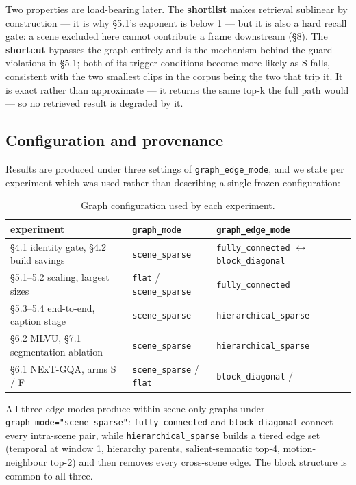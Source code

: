 \documentclass[sigconf,review,anonymous]{acmart}
\begin{document}
Two properties are load-bearing later. The \textbf{shortlist} makes retrieval sublinear by
construction --- it is why §5.1's exponent is below 1 --- but it is also a hard recall gate: a
scene excluded here cannot contribute a frame downstream (§8). The \textbf{shortcut} bypasses the
graph entirely and is the mechanism behind the guard violations in §5.1; both of its trigger
conditions become more likely as S falls, consistent with the two smallest clips in the
corpus being the two that trip it. It is exact rather than approximate --- it returns the same top-k the
full path would --- so no retrieved result is degraded by it.

\subsection{Configuration and provenance}

Results are produced under three settings of \texttt{graph\_edge\_mode}, and we state per experiment
which was used rather than describing a single frozen configuration:

\begin{table}[t]
\small
\setlength{\tabcolsep}{4pt}
\caption{Graph configuration used by each experiment.}
\begin{tabular}{lll}
\toprule
experiment & \texttt{graph\_mode} & \texttt{graph\_edge\_mode} \\
\midrule
§4.1 identity gate, §4.2 build savings & \texttt{scene\_sparse} & \texttt{fully\_connected} \ensuremath{\leftrightarrow} \texttt{block\_diagonal} \\
§5.1--5.2 scaling, largest sizes & \texttt{flat} / \texttt{scene\_sparse} & \texttt{fully\_connected} \\
§5.3--5.4 end-to-end, caption stage & \texttt{scene\_sparse} & \texttt{hierarchical\_sparse} \\
§6.2 MLVU, §7.1 segmentation ablation & \texttt{scene\_sparse} & \texttt{hierarchical\_sparse} \\
§6.1 NExT-GQA, arms S / F & \texttt{scene\_sparse} / \texttt{flat} & \texttt{block\_diagonal} / --- \\
\bottomrule
\end{tabular}
\end{table}

All three edge modes produce within-scene-only graphs under \texttt{graph\_mode="scene\_sparse"}:
\texttt{fully\_connected} and \texttt{block\_diagonal} connect every intra-scene pair, while
\texttt{hierarchical\_sparse} builds a tiered edge set (temporal at window 1, hierarchy parents,
salient-semantic top-4, motion-neighbour top-2) and then removes every cross-scene edge. The
block structure is common to all three.
\end{document}
